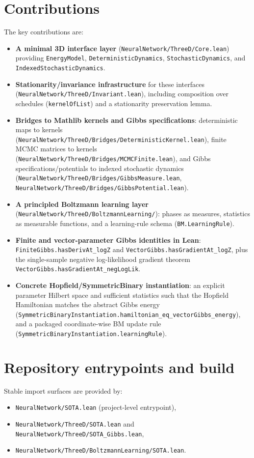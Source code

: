 \documentclass[11pt]{article}
\newcommand{\lean}[1]{\texttt{#1}}
\newcommand{\file}[1]{\texttt{#1}}
\begin{document}
\section{Contributions}
The key contributions are:
\begin{itemize}[leftmargin=2em]
\item \textbf{A minimal 3D interface layer} (\file{NeuralNetwork/ThreeD/Core.lean}) providing
  \lean{EnergyModel}, \lean{DeterministicDynamics}, \lean{StochasticDynamics}, and
  \lean{IndexedStochasticDynamics}.
\item \textbf{Stationarity/invariance infrastructure} for these interfaces
  (\file{NeuralNetwork/ThreeD/Invariant.lean}), including composition over schedules
  (\lean{kernelOfList}) and a stationarity preservation lemma.
\item \textbf{Bridges to Mathlib kernels and Gibbs specifications}:
  deterministic maps to kernels
  (\file{NeuralNetwork/ThreeD/Bridges/DeterministicKernel.lean}),
  finite MCMC matrices to kernels
  (\file{NeuralNetwork/ThreeD/Bridges/MCMCFinite.lean}),
  and Gibbs specifications/potentials to indexed stochastic dynamics
  (\file{NeuralNetwork/ThreeD/Bridges/GibbsMeasure.lean},
   \file{NeuralNetwork/ThreeD/Bridges/GibbsPotential.lean}).
\item \textbf{A principled Boltzmann learning layer}
  (\file{NeuralNetwork/ThreeD/BoltzmannLearning/}): phases as measures, statistics as
  measurable functions, and a learning-rule schema (\lean{BM.LearningRule}).
\item \textbf{Finite and vector-parameter Gibbs identities in Lean}:
  \lean{FiniteGibbs.hasDerivAt_logZ} and \lean{VectorGibbs.hasGradientAt_logZ}, plus the
  single-sample negative log-likelihood gradient theorem
  \lean{VectorGibbs.hasGradientAt_negLogLik}.
\item \textbf{Concrete Hopfield/SymmetricBinary instantiation}:
  an explicit parameter Hilbert space and sufficient statistics such that the Hopfield Hamiltonian
  matches the abstract Gibbs energy
  (\lean{SymmetricBinaryInstantiation.hamiltonian_eq_vectorGibbs_energy}),
  and a packaged coordinate-wise BM update rule
  (\lean{SymmetricBinaryInstantiation.learningRule}).
\end{itemize}

\section{Repository entrypoints and build}
Stable import surfaces are provided by:
\begin{itemize}[leftmargin=2em]
\item \file{NeuralNetwork/SOTA.lean} (project-level entrypoint),
\item \file{NeuralNetwork/ThreeD/SOTA.lean} and \file{NeuralNetwork/ThreeD/SOTA_Gibbs.lean},
\item \file{NeuralNetwork/ThreeD/BoltzmannLearning/SOTA.lean}.
\end{itemize}
\end{document}
